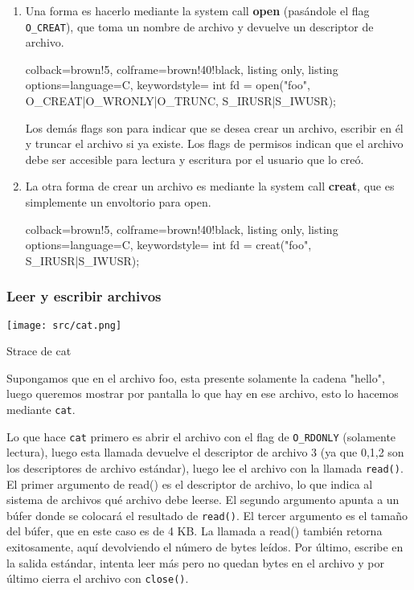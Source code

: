 \documentclass[openany]{book}
\begin{document}
\begin{enumerate}
    \item Una forma es hacerlo mediante la system call \textbf{open} (pasándole el flag \texttt{O\_CREAT}), que toma un nombre de archivo y devuelve un descriptor de archivo. 
    \begin{tcblisting}{colback=brown!5, colframe=brown!40!black, listing only, listing options={language=C, keywordstyle=\color{blue!35!white}\bfseries}}
    int fd = open("foo", O_CREAT|O_WRONLY|O_TRUNC, S_IRUSR|S_IWUSR);
    \end{tcblisting}
    Los demás flags son para indicar que se desea crear un archivo, escribir en él y truncar el archivo si ya existe. Los flags de permisos indican que el archivo debe ser accesible para lectura y escritura por el usuario que lo creó.
    \item La otra forma de crear un archivo es mediante la system call \textbf{creat}, que es simplemente un envoltorio para open.
    \begin{tcblisting}{colback=brown!5, colframe=brown!40!black, listing only, listing options={language=C, keywordstyle=\color{blue!35!white}\bfseries}}
    int fd = creat("foo", S_IRUSR|S_IWUSR);
    \end{tcblisting}
\end{enumerate}

\subsubsection{Leer y escribir archivos}

\begin{floatingfigure}[r]{0.4\textwidth}
    \texttt{[image: src/cat.png]}
    \caption{Strace de cat}
\end{floatingfigure}

Supongamos que en el archivo foo, esta presente solamente la cadena "hello", luego queremos mostrar por pantalla lo que hay en ese archivo, esto lo hacemos mediante \texttt{cat}.

Lo que hace \texttt{cat} primero es \colorbox{yellow!20}{abrir} el archivo con el flag de \texttt{O\_RDONLY} (solamente lectura), luego esta llamada devuelve el descriptor de archivo $3$ (ya que 0,1,2 son los descriptores de archivo estándar), luego \colorbox{yellow!20}{lee} el archivo con la llamada \texttt{read()}. El primer argumento de read() es el \colorbox{yellow!20}{descriptor} de archivo, lo que indica al sistema de archivos qué archivo debe leerse. El segundo argumento apunta a un \colorbox{yellow!20}{búfer} donde se colocará el resultado de \texttt{read()}. El tercer argumento es el \colorbox{yellow!20}{tamaño del búfer}, que en este caso es de 4 KB. La llamada a read() también retorna exitosamente, aquí devolviendo el número de \colorbox{yellow!20}{bytes leídos}. Por último, escribe en la salida estándar, intenta leer más pero no quedan bytes en el archivo y por último cierra el archivo con \texttt{close()}.
\end{document}
